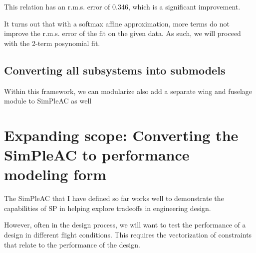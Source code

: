 This relation has an r.m.s. error of 0.346, which is a significant improvement. 

It turns out that with a softmax affine approximation, more terms do not improve the r.m.s.
error of the fit on the given data. As such, we will proceed with the 2-term posynomial fit. 




\subsection{Converting all subsystems into submodels}

Within this framework, we can modularize also add a separate wing and fuselage module to
SimPleAC as well

\section{Expanding scope: Converting the SimPleAC to performance modeling form}

The SimPleAC that I have defined so far works well to demonstrate the
capabilities of \gls{SP} in helping explore tradeoffs in engineering design.

However, often in the design process, we will want to test the performance of a
design in different flight conditions. This requires the vectorization of 
constraints that relate to the performance of the design. 
